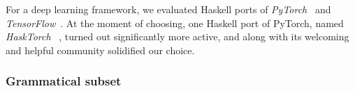 \documentclass{article}
\begin{document}
For a deep learning framework, we evaluated Haskell ports of
\emph{PyTorch}~\citep{pytorch} and \emph{TensorFlow}~\citep{abadi2016tensorflow}.
At the moment of choosing, one Haskell port of PyTorch,
named \emph{HaskTorch}~\citep{hasktorch}%
%
%
,
turned out significantly more active,
and along with its welcoming and helpful community solidified our choice.

\subsubsection{Grammatical subset} \label{sec:grammar}


\end{document}
